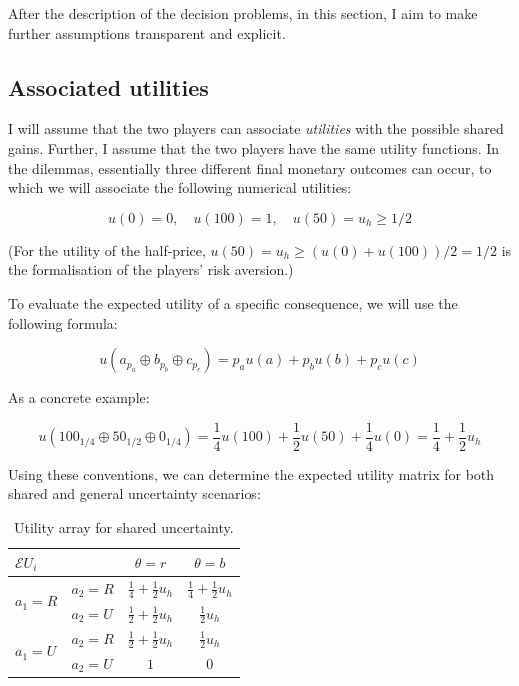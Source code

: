 \documentclass{article}
\theoremstyle{definition}
\begin{document}
After the description of the decision problems, in this section, I aim to make further assumptions transparent and explicit.

\subsection{Associated utilities}

I will assume that the two players can associate \emph{utilities} with the possible shared gains.
Further, I assume that the two players have the same utility functions.
In the dilemmas, essentially three different final monetary outcomes can occur, to which we will associate the following numerical utilities:

\begin{equation}
u(0) = 0, \quad u(100) = 1, \quad u(50)=u_h \ge 1/2
\end{equation}

(For the utility of the half-price, $u(50)=u_h \ge (u(0)+u(100))/2 = 1/2$ is the formalisation of the players’ risk aversion.)

To evaluate the expected utility of a specific consequence, we will use the following formula:

\begin{equation}
u(a_{p_a} \oplus b_{p_b} \oplus c_{p_c})
=
p_a u(a) + p_b u(b) + p_c u(c)
\end{equation}

As a concrete example:

\begin{equation}
u(100_{1/4} \oplus 50_{1/2} \oplus 0_{1/4})
=
\frac{1}{4} u(100)+ \frac{1}{2} u(50) + \frac{1}{4} u(0)
=
\frac{1}{4} + \frac{1}{2}u_h
\end{equation}

Using these conventions, we can determine the expected utility matrix for both shared and general uncertainty scenarios:

\begin{table}[H]
\begin{center}
\renewcommand{\arraystretch}{1.3} %
\begin{tabular}{|l l|c c|}
\hline
\multirow{1}{*}{$\mathcal{E}U_i$} & & $\theta=r$  & $\theta=b$\\
\hline
\multirow{2}{*}{$a_1=R$}
  & $a_2=R$ &
  $\frac{1}{4} +  \frac{1}{2} u_h$ &
  $\frac{1}{4} +  \frac{1}{2} u_h$\\
\cline{2-4}
  & $a_2=U$ &
  $\frac{1}{2} + \frac{1}{2} u_h$ &
  $\frac{1}{2} u_h$\\
\hline
\multirow{2}{*}{$a_1=U$}
  & $a_2=R$ &
  $\frac{1}{2} + \frac{1}{2} u_h$ &
  $\frac{1}{2} u_h$\\
\cline{2-4}
  & $a_2=U$ &
  $1$ &  $0$\\
\hline
\end{tabular}
\caption{Utility array for shared uncertainty.}
    \label{tab:UtilitySharedUncertainty}
\end{center}
\end{table}
\end{document}
